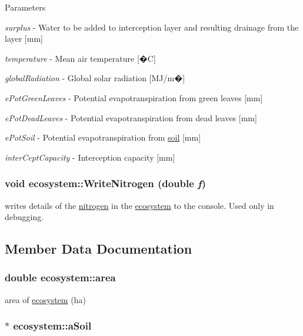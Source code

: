 \begin{DoxyParams}{Parameters}
\item[{\em surplus}]-\/ Water to be added to interception layer and resulting drainage from the layer \mbox{[}mm\mbox{]} \item[{\em temperature}]-\/ Mean air temperature \mbox{[}�C\mbox{]} \item[{\em globalRadiation}]-\/ Global solar radiation \mbox{[}MJ/m�\mbox{]} \item[{\em ePotGreenLeaves}]-\/ Potential evapotranspiration from green leaves \mbox{[}mm\mbox{]} \item[{\em ePotDeadLeaves}]-\/ Potential evapotranspiration from dead leaves \mbox{[}mm\mbox{]} \item[{\em ePotSoil}]-\/ Potential evapotranspiration from \hyperlink{classsoil}{soil} \mbox{[}mm\mbox{]} \item[{\em interCeptCapacity}]-\/ Interception capacity \mbox{[}mm\mbox{]} \end{DoxyParams}
\hypertarget{classecosystem_a0fb0b24e9d254fd625f42b881afbebc7}{
\subsubsection[{WriteNitrogen}]{\setlength{\rightskip}{0pt plus 5cm}void ecosystem::WriteNitrogen (double {\em f})}}
\label{classecosystem_a0fb0b24e9d254fd625f42b881afbebc7}


writes details of the \hyperlink{classnitrogen}{nitrogen} in the \hyperlink{classecosystem}{ecosystem} to the console. Used only in debugging. 

\subsection{Member Data Documentation}
\hypertarget{classecosystem_a8324bc15b82ac900c54afceed501d57d}{
\subsubsection[{area}]{\setlength{\rightskip}{0pt plus 5cm}double {\bf ecosystem::area}}}
\label{classecosystem_a8324bc15b82ac900c54afceed501d57d}


area of \hyperlink{classecosystem}{ecosystem} (ha) \hypertarget{classecosystem_a875bd0393f05bb6a71e5194459498038}{
\subsubsection[{aSoil}]{$\ast$ {\bf ecosystem::aSoil}}}
\label{classecosystem_a875bd0393f05bb6a71e5194459498038}


